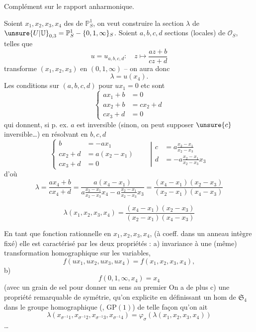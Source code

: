 Complément sur le rapport anharmonique.

Soient $x_1,x_2,x_3,x_4$ des  de
$\mathbb P^1_S$, on veut construire la section  $\lambda$
de $\unsure{U|\mathbb U}_{0,3}=\mathbb P^1_S-\{0,1,\infty\}_S$.
Soient $a,b,c,d$ sections
(locales) de $\mathcal O_S$,  telles que
\[
u=u_{a,b,c,d}:\quad z\longmapsto\frac{az+b}{cz+d}
\tag{77}
\]
transforme $(x_1,x_2,x_3)$ en $(0,1,\infty)$ -- on
aura donc
\[
\lambda=u(x_4).
\tag{78}
\]
Les conditions sur  $(a,b,c,d)$ pour $ux_1=0$ etc sont
\[
\left\{\begin{aligned}
ax_1+b&=0\\
ax_2+b&=cx_2+d\\
cx_3+d&=0
\end{aligned}\right.
\]
qui donnent, si p. ex. $a$ est inversible (sinon, on
peut supposer $\unsure{c}$ inversible\ldots) en résolvant en $b,c,d$
\[
\left\{\begin{aligned}
b&=-ax_1\\
cx_2+d&=a(x_2-x_1)\\
cx_3+d&=0
\end{aligned}\right.
\qquad\left|\begin{aligned}
c&=a\frac{x_2-x_1}{x_2-x_3}\\
d&=-a\frac{x_2-x_1}{x_2-x_3}x_3
\end{aligned}\right.
\]
d'où
\[
\lambda=\frac{ax_4+b}{cx_4+d}
=\frac{a(x_4-x_1)}{a\frac{x_2-x_1}{x_2-x_3}x_4-a\frac{x_2-x_1}{x_2-x_3}x_3}
=\frac{(x_4-x_1)(x_2-x_3)}{(x_2-x_1)(x_4-x_3)}
\]


\[
\lambda(x_1,x_2,x_3,x_4)=\frac{(x_4-x_1)(x_2-x_3)}{(x_2-x_1)(x_4-x_3)}
\tag{79}
\]

En tant que fonction rationnelle en $x_1,x_2,x_3,x_4$,
(à coeff. dans un anneau intègre fixé) elle
est caractérisé par les deux propriétés : a) invariance  à une (même) transformation
homographique sur les variables,  
\[
f(ux_1,ux_2,ux_3,ux_4)=f(x_1,x_2,x_3,x_4),
\]
 b)
\[
f(0,1,\infty,x_4)=x_4
\]
(avec un grain de sel pour donner un
sens au premier  On a de plus
c) une propriété remarquable de symétrie,
qu'on  explicite en définissant un hom
de $\mathfrak S_4$ dans le groupe homographique
(, $\mathrm{GP}(1)$)
de telle façon qu'on ait
\[
\lambda(x_{\sigma^{-1}1},x_{\sigma^{-1}2},x_{\sigma^{-1}3},x_{\sigma^{-1}4})
=\varphi_\sigma(\lambda(x_1,x_2,x_3,x_4))
\tag{80}
\]
\ldots
